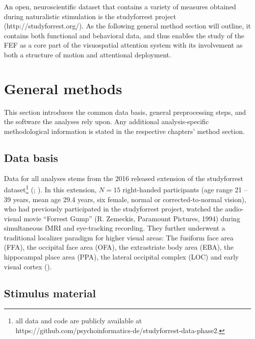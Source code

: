 \documentclass[a4paper, 12pt]{scrreprt}
\begin{document}
An open, neuroscientific dataset that contains a variety of measures obtained during naturalistic stimulation is the studyforrest project (http://studyforrest.org/). As the following general method section will outline, it contains both functional and behavioral data, and thus enables the study of the FEF as a core part of the visuospatial attention system with its involvement as both a structure of motion and attentional deployment.



\section{General methods}\label{section:generalmethods}

This section introduces the common data basis, general preprocessing steps, and the software the analyses rely upon. Any additional analysis-specific methodological information is stated in the respective chapters' method section.

\subsection{Data basis}

Data for all analyses stems from the 2016 released extension of the studyforrest dataset\footnote{all data and code are publicly available at https://github.com/psychoinformatics-de/studyforrest-data-phase2.} (\cite{hanke2016studyforrest}; \cite{sengupta2016studyforrest}). In this extension, $N = 15$ right-handed participants (age range 21 – 39 years, mean age 29.4 years, six female, normal or corrected-to-normal vision), who had previously participated in the studyforrest project, watched the audio-visual movie “Forrest Gump” (R. Zemeckis, Paramount Pictures, 1994) during simultaneous fMRI and eye-tracking recording. They further underwent a traditional localizer paradigm for higher visual areas: The fusiform face area (FFA), the occipital face area (OFA), the extrastriate body area (EBA), the hippocampal place area (PPA), the lateral occipital complex (LOC) and early visual cortex (\cite{sengupta2016studyforrest}).

\subsection{Stimulus material}
\end{document}
